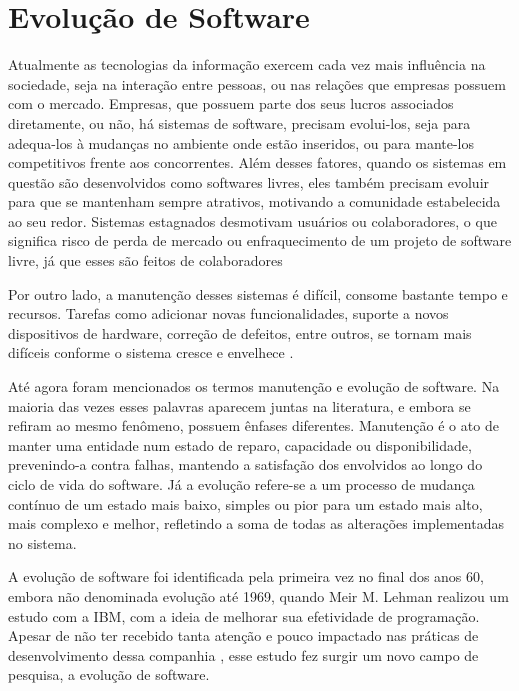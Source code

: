 \chapter{Evolução de Software}



Atualmente as tecnologias da informação exercem cada vez mais influência na sociedade, seja na interação entre pessoas, ou nas relações que empresas possuem com o mercado. Empresas, que possuem parte dos seus lucros associados diretamente, ou não, há sistemas de software, precisam evolui-los, seja para adequa-los à mudanças no ambiente onde estão inseridos, ou para mante-los competitivos frente aos concorrentes. Além desses fatores, quando os sistemas em questão são desenvolvidos como softwares livres, eles também precisam evoluir para que se mantenham sempre atrativos, motivando a comunidade estabelecida ao seu redor. Sistemas estagnados desmotivam usuários ou colaboradores, o que significa risco de perda de mercado ou enfraquecimento de um projeto de software livre, já que esses são feitos de colaboradores

Por outro lado, a manutenção desses sistemas é difícil, consome bastante tempo e recursos. Tarefas como adicionar novas funcionalidades, suporte a novos dispositivos de hardware, correção de defeitos, entre outros, se tornam mais difíceis conforme o sistema cresce e envelhece \cite{godfrey2000evolution}.

Até agora foram mencionados os termos manutenção e evolução de software. Na maioria das vezes esses palavras aparecem juntas na literatura, e embora se refiram ao mesmo fenômeno, possuem ênfases diferentes. Manutenção é o ato de manter uma entidade num estado de reparo, capacidade ou disponibilidade, prevenindo-a contra falhas, mantendo a satisfação dos envolvidos ao longo do ciclo de vida do software. Já a evolução refere-se a um processo de mudança contínuo de um estado mais baixo, simples ou pior para um estado mais alto, mais complexo e melhor, refletindo a soma de todas as alterações implementadas no sistema.

A evolução de software foi identificada pela primeira vez no final dos anos 60, embora não denominada evolução até 1969, quando Meir M. Lehman realizou um estudo com a IBM, com a ideia de melhorar sua efetividade de programação. Apesar de não ter recebido tanta atenção e pouco impactado nas práticas de desenvolvimento dessa companhia , esse estudo fez surgir um novo campo de pesquisa, a evolução de software.

